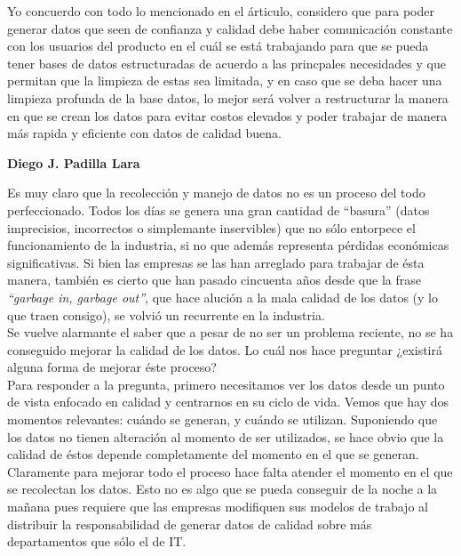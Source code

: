 \documentclass{article}
\begin{document}
Yo concuerdo con todo lo mencionado en el árticulo, considero que para poder generar datos que seen de confianza y calidad debe haber 
comunicación constante con los usuarios del producto en el cuál se está trabajando para que se pueda tener bases de datos estructuradas 
de acuerdo a las princpales necesidades y que permitan que la limpieza de estas sea limitada, y en caso que se deba hacer una limpieza 
profunda de la base datos, lo mejor será volver a restructurar la manera en que se crean los datos para evitar costos elevados y poder 
trabajar de manera más rapida y eficiente con datos de calidad buena.


\vspace{4mm}
\begin{center}
    \textbf{Diego J. Padilla Lara}
\end{center}
Es muy claro que la recolección y manejo de datos no es un proceso del todo perfeccionado. Todos los días se genera una 
gran cantidad de ``basura'' (datos imprecisios, incorrectos o simplemante inservibles) que no sólo entorpece el 
funcionamiento de la industria, si no que además representa pérdidas económicas significativas. Si bien las empresas se 
las han arreglado para trabajar de ésta manera, también es cierto que han pasado cincuenta años desde que la frase
\textit{``garbage in, garbage out''}, que hace alución a la mala calidad de los datos (y lo que traen consigo),  
se volvió un recurrente en la industria. \\ 

Se vuelve alarmante el saber que a pesar de no ser un problema reciente, no se ha conseguido mejorar la calidad de los
datos. Lo cuál nos hace preguntar ¿existirá alguna forma de mejorar éste proceso? \\ 

Para responder a la pregunta, primero necesitamos ver los datos desde un punto de vista enfocado en calidad y centrarnos 
en su ciclo de vida. Vemos que hay dos momentos relevantes: cuándo se generan, y cuándo se utilizan. Suponiendo que los 
datos no tienen alteración al momento de ser utilizados, se hace obvio que la calidad de éstos depende completamente 
del momento en el que se generan. \\ 

Claramente para mejorar todo el proceso hace falta atender el momento en el que se recolectan los datos. Esto no es 
algo que se pueda conseguir de la noche a la mañana pues requiere que las empresas modifiquen sus modelos de 
trabajo al distribuir la responsabilidad de generar datos de calidad sobre más departamentos que sólo el de IT. \\ 
\end{document}
